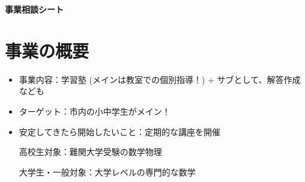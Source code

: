 ﻿\documentclass[12pt]{article}
\begin{document}
\begin{center}
    {\LARGE \bf 事業相談シート} \\
\end{center}

\vspace{1mm}

\section{事業の概要}
\begin{itemize}[leftmargin=1.5em, itemsep=3mm, parsep=4pt]
  \item 事業内容：学習塾 (メインは教室での個別指導！) + サブとして、解答作成なども
  \item ターゲット：市内の小中学生がメイン！
  \item 安定してきたら開始したいこと：定期的な講座を開催
  
  高校生対象：難関大学受験の数学物理
  
  大学生・一般対象：大学レベルの専門的な数学
\end{itemize}
\end{document}

